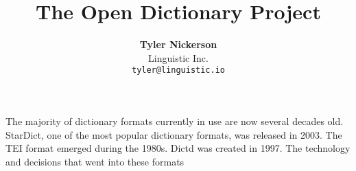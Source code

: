 \documentclass{article}
\begin{document}
\title{\textbf{The Open Dictionary Project}}
\author{\textbf{Tyler Nickerson} \\ \small{Linguistic Inc.} \\\texttt{\small{tyler@linguistic.io}}}
\date{}
\maketitle
The majority of dictionary formats currently in use are now several decades old. StarDict, one of the most popular dictionary formats, was released in 2003. The TEI format emerged during the 1980s. Dictd was created in 1997. The technology and decisions that went into these formats 
\end{document}

